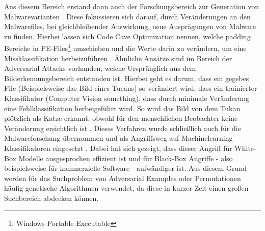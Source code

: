 Aus diesem Bereich erstand dann auch der Forschungsbereich zur Generation von Malwarevarianten \cite{jin_2023_on}. Diese fokussieren sich darauf, durch Veränderungen an den Malwarefiles, bei gleichbleibender Auswirkung, neue Ausprägungen von Malware zu finden. Hierbei lassen sich Code Cave Optimization nennen, welche padding Bereiche in PE-Files\footnote{Windows Portable Executable} umschieben und die Werte darin zu verändern, um eine Missklassifikation herbeizuführen \cite{yuste_2022_optimization}. Ähnliche Ansätze sind im Bereich der Adversarial Attacks vorhanden, welche Ursprünglich aus dem Bilderkennungsbereich entstanden ist. Hierbei geht es darum, dass ein gegebes File (Beispielsweise das Bild eines Tucans) so verändert wird, dass ein trainierter Klassifikator (Computer Vision something), dass durch minimale Veränderung eine Fehlklassifikation herbeigeführt wird. So wird das Bild von dem Tukan plötzlich als Katze erkannt, obwohl für den menschlichen Beobachter keine Veränderung ersichtlich ist \cite{demetrio_2024_formalizing}. Dieses Verfahren wurde schließlich auch für die Malwareforschung übernommen und als Angriffsweg auf Machinelearning Klassifikatoren eingesetzt \cite{demetrio_2021_functionalitypreserving}. Dabei hat sich gezeigt, dass dieser Angriff für White-Box Modelle ausgesprochen effizient ist und für Black-Box Angriffe - also beispielsweise für kommerzielle Software - aufwändiger ist\cite{yuste_2022_optimization}. Aus diesem Grund werden für das Suchproblem von Adversarial Examples oder Permutationen häufig genetische Algorithmen verwendet\cite{demetrio_2021_functionalitypreserving}, da diese in kurzer Zeit einen großen Suchbereich abdecken können. \label{adversarial_example}
